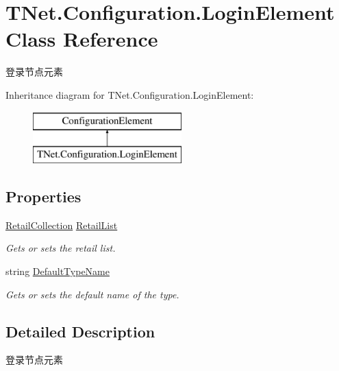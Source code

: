 \hypertarget{class_t_net_1_1_configuration_1_1_login_element}{}\section{T\+Net.\+Configuration.\+Login\+Element Class Reference}
\label{class_t_net_1_1_configuration_1_1_login_element}


登录节点元素  


Inheritance diagram for T\+Net.\+Configuration.\+Login\+Element\+:\begin{figure}[H]
\begin{center}
\leavevmode
\includegraphics[height=2.000000cm]{class_t_net_1_1_configuration_1_1_login_element}
\end{center}
\end{figure}
\subsection*{Properties}
\begin{DoxyCompactItemize}
\item 
\mbox{\hyperlink{class_t_net_1_1_configuration_1_1_retail_collection}{Retail\+Collection}} \mbox{\hyperlink{class_t_net_1_1_configuration_1_1_login_element_a6f8530fbe1c50b6676bb31af94b9d9f4}{Retail\+List}}
\begin{DoxyCompactList}\small\item\em Gets or sets the retail list. \end{DoxyCompactList}\item 
string \mbox{\hyperlink{class_t_net_1_1_configuration_1_1_login_element_a718778b229264da65ea47504e3e99466}{Default\+Type\+Name}}
\begin{DoxyCompactList}\small\item\em Gets or sets the default name of the type. \end{DoxyCompactList}\end{DoxyCompactItemize}


\subsection{Detailed Description}
登录节点元素 



